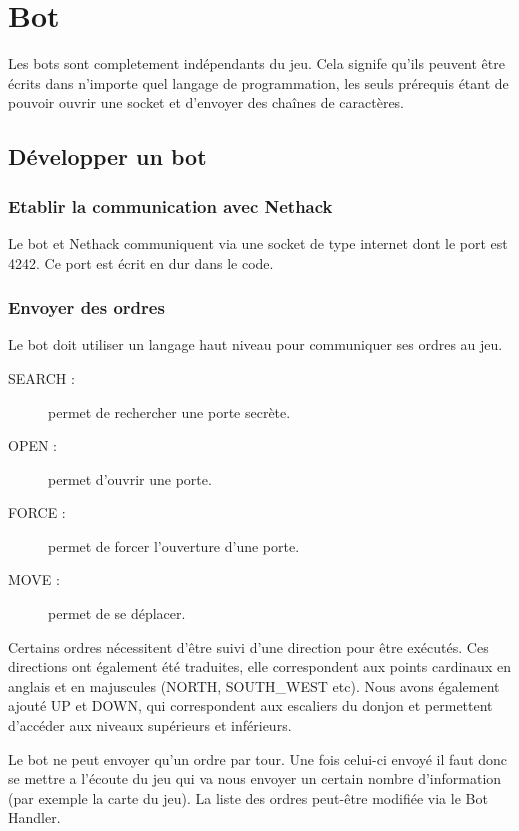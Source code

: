 \chapter{Bot}

Les bots sont completement indépendants du jeu. Cela signife qu'ils peuvent être écrits dans n'importe quel langage de programmation, les seuls prérequis étant de pouvoir ouvrir une socket et d'envoyer des chaînes de caractères.

\section{Développer un bot}

\subsection{Etablir la communication avec Nethack}
Le bot et Nethack communiquent via une socket de type internet dont le port est 4242. Ce port est écrit en dur dans le code.

\subsection{Envoyer des ordres}
Le bot doit utiliser un langage haut niveau pour communiquer ses ordres au jeu.

\begin{description}
\item[SEARCH :] permet de rechercher une porte secrète.
\item[OPEN :] permet d'ouvrir une porte.
\item[FORCE :] permet de forcer l'ouverture d'une porte.
\item[MOVE :] permet de se déplacer.
\end{description}

Certains ordres nécessitent d'être suivi d'une direction pour être exécutés. Ces directions ont également été traduites, elle correspondent aux points cardinaux en anglais et en majuscules (NORTH, SOUTH\_WEST etc). Nous avons également ajouté UP et DOWN, qui correspondent aux escaliers du donjon et permettent d'accéder aux niveaux supérieurs et inférieurs.

Le bot ne peut envoyer qu'un ordre par tour. Une fois celui-ci envoyé il faut donc se mettre a l'écoute du jeu qui va nous envoyer un certain nombre d'information (par exemple la carte du jeu). La liste des ordres peut-être modifiée via le Bot Handler.

